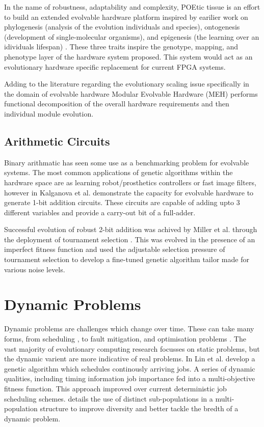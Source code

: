 In the name of robustness, adaptability and complexity, POEtic tissue
\cite{Tyrrell:2003:PTI:1766731.1766747} is
an effort to build an extended evolvable hardware platform inspired by
earilier work on phylogenesis (analysis of the evolution individuals and species),
ontogenesis (development of single-molecular organisms), and epigenesis
(the learning over an idividuals lifespan) \cite{10.1007/3-540-63173-9_37}.
These three traits inspire the genotype, mapping, and phenotype layer of the
hardware system proposed. This system would act as an evolutionary hardware
specific replacement for current FPGA systems.

Adding to the literature regarding the evolutionary scaling issue specifically
in the domain of evolvable hardware
Modular Evolvable Hardware (MEH) \cite{1299561} performs functional decomposition
of the overall hardware requirements and then individual module evolution.

\subsection{Arithmetic Circuits}

Binary arithmatic has seen some use as a benchmarking problem for evolvable systems.
The most common applications of genetic algorithms within the hardware space
are as learning robot/prosthetics controllers or fast image filters, however
in \cite{Miller_multiple-valuedcombinational} Kalganova et al. demonstrate the
capacity for evolvable hardware to generate 1-bit addition circuits. These
circuits are capable of adding upto 3 different variables and provide a carry-out
bit of a full-adder.

Successful evolution of robust 2-bit addition was achived by Miller et al. through
the deployment of tournament selection \cite{TournamentAdder}. This was evolved
in the presence of an imperfect fitness function and used the adjustable selection
pressure of tournament selection to develop a fine-tuned genetic algorithm tailor
made for various noise levels.

\section{Dynamic Problems}

Dynamic problems are challenges which change over time. These can take many
forms, from scheduling \cite{LIN1997AGA}, to fault mitigation, and optimisation problems
\cite{Branke2003}. The vast majority of evolutionary computing research focusses on
static problems, but the dynamic varient are more indicative of real problems.
In \cite{LIN1997AGA} Lin et al. develop a genetic algorithm
which schedules continously arriving jobs. A series of dynamic qualities, including
timing information job importance fed into a multi-objective fitness function. This
approach improved over current deterministic job scheduling schemes. \cite{Branke2003}
details the use of distinct sub-populations in a multi-population structure to
improve diversity and better tackle the bredth of a dynamic problem.

